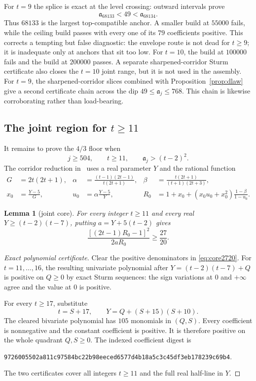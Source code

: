 \documentclass[11pt,a4paper]{article}
\theoremstyle{plain}
\newtheorem{lemma}[theorem]{Lemma}
\theoremstyle{remark}
\newcommand{\level}{\mathfrak a}
\begin{document}
For $t=9$ the splice is exact at the level crossing: outward intervals prove
\[
 \level_{68133}<49<\level_{68134}.
\]
Thus $68133$ is the largest top-compatible anchor.  A smaller build at
$55000$ fails, while the ceiling build passes with every one of its $79$
coefficients positive.  This corrects a tempting but false diagnostic: the
envelope route is not dead for $t\ge9$; it is inadequate only at anchors that
sit too low.  For $t=10$, the build at $100000$ fails and the build at
$200000$ passes.  A separate sharpened-corridor Sturm certificate also closes
the $t=10$ joint range, but it is not used in the assembly.
For $t=9$, the sharpened-corridor slices combined with
Proposition~\ref{prop:dlaw} give a second certificate chain across the dip
$49\le\level_j\le768$.  This chain is likewise corroborating rather than
load-bearing.

\subsection{The joint region for \texorpdfstring{$t\ge11$}{t >= 11}}

It remains to prove the $4/3$ floor when
\begin{equation}\label{eq:jointdomain}
 j\ge504,\qquad t\ge11,\qquad \level_j>(t-2)^2.
\end{equation}
The corridor reduction in~\cite{squaretail} uses a real parameter $Y$ and the
rational function
\begin{align}
 G&=2t(2t+1),&
 \alpha&=\frac{(t-1)(2t-1)}{t(2t+1)},&
 \beta&=\frac{t(2t+1)}{(t+1)(2t+3)},\nonumber\\
 x_0&=\frac{Y-5}{G},&
 u_0&=\alpha\frac{Y-5}{Y},&
 R_0&=1+x_0+(x_0u_0+x_0^2)\frac{1-\beta}{1-u_0}.
\label{eq:R0}
\end{align}

\begin{lemma}[joint core]\label{lem:jointcore}
For every integer $t\ge11$ and every real
$Y\ge(t-2)(t-7)$, putting $a=Y+5(t-2)$ gives
\begin{equation}\label{eq:core2720}
 \frac{[(2t-1)R_0-1]^2}{2aR_0}\ge\frac{27}{20}.
\end{equation}
\end{lemma}

\begin{proof}[Exact polynomial certificate]
Clear the positive denominators in \eqref{eq:core2720}.  For
$t=11,\dots,16$, the resulting univariate polynomial after
$Y=(t-2)(t-7)+Q$ is positive on $Q\ge0$ by exact Sturm sequences: the sign
variations at $0$ and $+\infty$ agree and the value at $0$ is positive.

For every $t\ge17$, substitute
\[
 t=S+17,\qquad Y=Q+(S+15)(S+10).
\]
The cleared bivariate polynomial has $105$ monomials in $(Q,S)$.  Every
coefficient is nonnegative and the constant coefficient is positive.  It is
therefore positive on the whole quadrant $Q,S\ge0$.  The indexed coefficient
digest is
\begin{center}
\texttt{9726005502a811c97584bc22b98eeced6577d4b18a5c3c45df3eb178239c69b4}.
\end{center}
The two certificates cover all integers $t\ge11$ and the full real half-line
in $Y$.
\end{proof}
\end{document}
